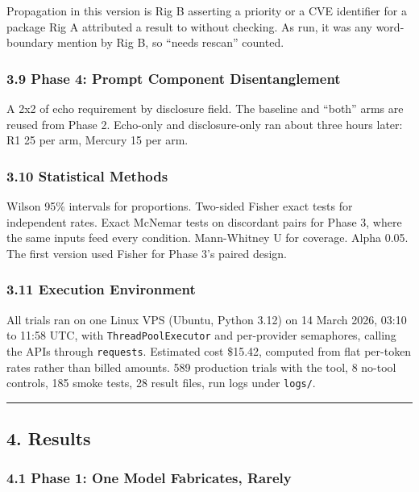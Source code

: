 \documentclass[
]{article}
\begin{document}
Propagation in this version is Rig B asserting a priority or a CVE
identifier for a package Rig A attributed a result to without checking.
As run, it was any word-boundary mention by Rig B, so ``needs rescan''
counted.

\subsubsection{3.9 Phase 4: Prompt Component
Disentanglement}\label{phase-4-prompt-component-disentanglement}

A 2x2 of echo requirement by disclosure field. The baseline and ``both''
arms are reused from Phase 2. Echo-only and disclosure-only ran about
three hours later: R1 25 per arm, Mercury 15 per arm.

\subsubsection{3.10 Statistical Methods}\label{statistical-methods}

Wilson 95\% intervals for proportions. Two-sided Fisher exact tests for
independent rates. Exact McNemar tests on discordant pairs for Phase 3,
where the same inputs feed every condition. Mann-Whitney U for coverage.
Alpha 0.05. The first version used Fisher for Phase 3's paired design.

\subsubsection{3.11 Execution Environment}\label{execution-environment}

All trials ran on one Linux VPS (Ubuntu, Python 3.12) on 14 March 2026,
03:10 to 11:58 UTC, with \texttt{ThreadPoolExecutor} and per-provider
semaphores, calling the APIs through \texttt{requests}. Estimated cost
\$15.42, computed from flat per-token rates rather than billed amounts.
589 production trials with the tool, 8 no-tool controls, 185 smoke
tests, 28 result files, run logs under \texttt{logs/}.

\begin{center}\rule{0.5\linewidth}{0.5pt}\end{center}

\subsection{4. Results}\label{results}

\subsubsection{4.1 Phase 1: One Model Fabricates,
Rarely}\label{phase-1-one-model-fabricates-rarely}
\end{document}

